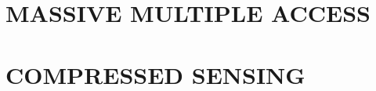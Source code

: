 \documentclass[12pt]{report}
\begin{document}
\renewcommand{\tamumanuscripttitle}{Applications of Coding Theory to Massive Multiple Access and Big Data Problems}

\renewcommand{\tamupapertype}{Dissertation}

\renewcommand{\tamufullname}{Avinash Vem}

\renewcommand{\tamudegree}{Doctor of Philosophy}
\renewcommand{\tamuchairone}{Krishna R. Narayanan}


\renewcommand{\tamumemberone}{Arun R. Srinivasa}
\newcommand{\tamumembertwo}{Jean-Francois Chamberland}
\newcommand{\tamumemberthree}{Alex Sprintson}
\renewcommand{\tamudepthead}{Miroslav M. Begovic}

\renewcommand{\tamugradmonth}{December}
\renewcommand{\tamugradyear}{2017}
\renewcommand{\tamudepartment}{Electrical Engineering}



%
%
%
%



%
\chapter{MASSIVE MULTIPLE ACCESS}
\label{chap:MAC}



\chapter{COMPRESSED SENSING}
\label{chap:cs}

\end{document}
